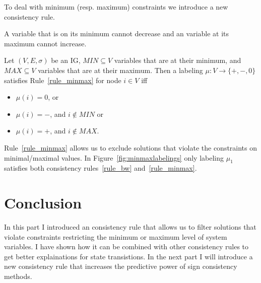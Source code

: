 To deal with minimum (resp. maximum) constraints we introduce a new consistency rule.

\begin{srule}
\label{rule_minmax}
{\upshape A variable that is on its minimum cannot decrease and an variable at its maximum cannot increase.}

Let $(V, E, \sigma)$ be an IG, 
$MIN \subseteq V$ variables that are at their minimum, and  
$MAX \subseteq V$ variables that are at their maximum.
Then a labeling $\mu : V \rightarrow \{\plus, \minus, 0\}$ satisfies Rule~\ref{rule_minmax} for node $i \in V$ iff
\begin{itemize}
 \item $\mu(i) = 0$, or
 \item $\mu(i) = \minus$, and $i \notin MIN$ or 
 \item $\mu(i) = \plus$, and $i \notin MAX$.
\end{itemize}
\end{srule}

Rule~\ref{rule_minmax} allows us to exclude solutions that violate the constraints on minimal/maximal values.
In Figure~\ref{fig:minmaxlabelings} only labeling $\mu_1$ satisfies both consistency rules~\ref{rule_bw} and~\ref{rule_minmax}.

\section*{Conclusion}
In this part I introduced an consistency rule that allows us to filter solutions that violate constraints 
 restricting the minimum or maximum level of system variables.
I have shown how it can be combined with other consistency rules to get better explainations for state transistions.
In the next part I will introduce a new consistency rule that increases the predictive power of sign consistency methods.